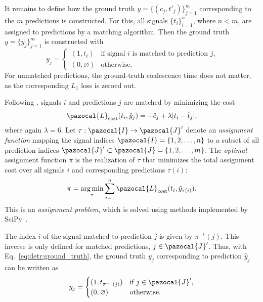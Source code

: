 It remains to define how the ground truth $y=\{(c_j,t'_j)\}_{j=1}^{m}$ corresponding to the $m$ predictions is constructed. For this, all signals $\{t_i\}_{i=1}^{n}$, where $n<m$, are assigned to predictions by a matching algorithm. Then the ground truth $y=\{y_j\}_{j=1}^{m}$ is constructed with
\begin{equation}
	\label{eq:detr:ground_truth}
	y_j = \begin{cases}
		(1, t_i) & \text{if signal $i$ is matched to prediction $j$,} \\
		(0, \varnothing) & \text{otherwise.}
	\end{cases}
\end{equation}
For unmatched predictions, the ground-truth coalescence time does not matter, as the corresponding $L_1$ loss is zeroed out.

Following \cite{10.1007/978-3-030-58452-8_13}, signals $i$ and predictions $j$ are matched by minimizing the cost
\begin{equation}
	\pazocal{L}_\text{cost}(t_i,\hat y_j)
	=
	-\hat c_j + \lambda|t_i-\hat t_j|,
\end{equation}
where again $\lambda=6$. Let $\tau:\pazocal{I}\rightarrow\pazocal{J}'$ denote an \emph{assignment function} mapping the signal indices $\pazocal{I}=\{1,2,\dots,n\}$ to a subset of all prediction indices $\pazocal{J}'\subset\pazocal{J}=\{1,2,\dots,m\}$. The \emph{optimal} assignment function $\pi$ is the realization of $\tau$ that minimizes the total assignment cost over all signals $i$ and corresponding predictions $\tau(i)$:
\begin{equation}
	\pi
	=
	\operatorname*{arg\,min}_{\tau}
	\sum_{i=1}^{n}
	\pazocal{L}_\text{cost}(t_i,\hat y_{\tau(i)}).
\end{equation}
This is an \emph{assignment problem}, which is solved using methods implemented by SciPy~\cite{2020SciPy-NMeth}.

The index $i$ of the signal matched to prediction $j$ is given by $\pi^{-1}(j)$. This inverse is only defined for matched predictions, $j\in\pazocal{J}'$. Thus, with Eq.~\ref{eq:detr:ground_truth}, the ground truth $y_j$ corresponding to prediction $\hat y_j$ can be written as
\begin{equation}
	y_j = \begin{cases}
		(1, t_{\pi^{-1}(j)}) & \text{if $j\in\pazocal{J}'$,} \\
		(0, \varnothing) & \text{otherwise.}
	\end{cases}
\end{equation}

